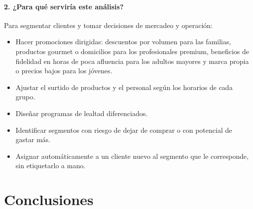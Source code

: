 \documentclass[11pt,letterpaper]{article}
\begin{document}
\paragraph{2. ¿Para qué serviría este análisis?}
Para segmentar clientes y tomar decisiones de mercadeo y operación:
\begin{itemize}
  \item Hacer promociones dirigidas: descuentos por volumen para las familias, productos gourmet o domicilios
        para los profesionales premium, beneficios de fidelidad en horas de poca afluencia para los adultos
        mayores y marca propia o precios bajos para los jóvenes.
  \item Ajustar el surtido de productos y el personal según los horarios de cada grupo.
  \item Diseñar programas de lealtad diferenciados.
  \item Identificar segmentos con riesgo de dejar de comprar o con potencial de gastar más.
  \item Asignar automáticamente a un cliente nuevo al segmento que le corresponde, sin etiquetarlo a mano.
\end{itemize}

\newpage
\section{Conclusiones}
\end{document}
